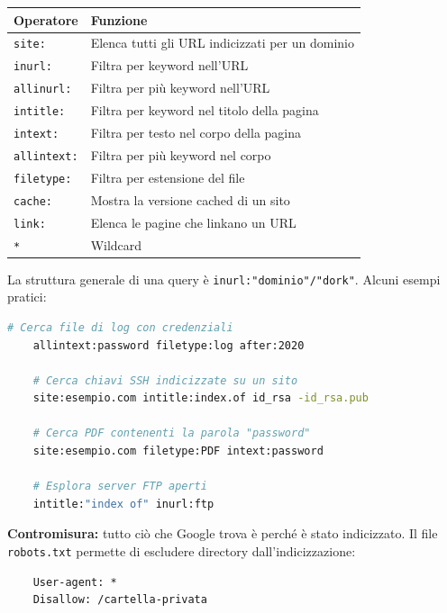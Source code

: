 \documentclass[12pt, a4paper]{report}
\begin{document}
\begin{table}[H]
	\centering
	\begin{tabular}{|l|l|}
		\hline
		\textbf{Operatore} & \textbf{Funzione} \\ \hline
		\texttt{site:} & Elenca tutti gli URL indicizzati per un dominio \\ \hline
		\texttt{inurl:} & Filtra per keyword nell'URL \\ \hline
		\texttt{allinurl:} & Filtra per più keyword nell'URL \\ \hline
		\texttt{intitle:} & Filtra per keyword nel titolo della pagina \\ \hline
		\texttt{intext:} & Filtra per testo nel corpo della pagina \\ \hline
		\texttt{allintext:} & Filtra per più keyword nel corpo \\ \hline
		\texttt{filetype:} & Filtra per estensione del file \\ \hline
		\texttt{cache:} & Mostra la versione cached di un sito \\ \hline
		\texttt{link:} & Elenca le pagine che linkano un URL \\ \hline
		\texttt{*} & Wildcard \\ \hline
	\end{tabular}
\end{table}

La struttura generale di una query è \texttt{inurl:"dominio"/"dork"}. Alcuni esempi pratici:

\begin{lstlisting}[language=bash, caption=Esempi di Google Dorks]
	# Cerca file di log con credenziali
	allintext:password filetype:log after:2020
	
	# Cerca chiavi SSH indicizzate su un sito
	site:esempio.com intitle:index.of id_rsa -id_rsa.pub
	
	# Cerca PDF contenenti la parola "password"
	site:esempio.com filetype:PDF intext:password
	
	# Esplora server FTP aperti
	intitle:"index of" inurl:ftp
\end{lstlisting}

\textbf{Contromisura:} tutto ciò che Google trova è perché è stato indicizzato. Il file \texttt{robots.txt} permette di escludere directory dall'indicizzazione:

\begin{lstlisting}
	User-agent: *
	Disallow: /cartella-privata
\end{lstlisting}
\end{document}
